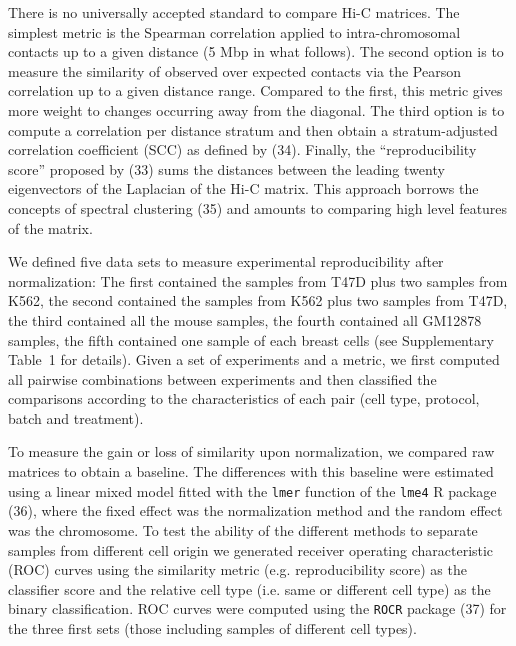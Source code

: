 \documentclass[a4,center,fleqn]{NAR}
\providecommand{\DIFadd}[1]{{\protect\color{red}#1}} %
\providecommand{\DIFdel}[1]{{\protect}}                      %
\providecommand{\DIFaddbegin}{} %
\providecommand{\DIFaddend}{} %
\providecommand{\DIFdelbegin}{} %
\providecommand{\DIFdelend}{} %
\begin{document}
There is no universally accepted standard to compare Hi-C matrices. The
simplest metric is the Spearman correlation applied to intra-chromosomal
contacts up to a given distance (5 \DIFdelbegin \DIFdel{Mb }\DIFdelend \DIFaddbegin \DIFadd{Mbp }\DIFaddend in what follows). The second option
is to measure the similarity of observed over expected contacts via the
Pearson correlation up to a given distance range. Compared to the first,
this metric gives more weight to changes occurring away from the diagonal.
The third option is to compute a correlation per distance stratum and then
obtain a stratum-adjusted correlation coefficient (SCC) as defined by
(34). Finally, the \DIFdelbegin \DIFdel{last option, }\DIFdelend \DIFaddbegin \DIFadd{``reproducibility score'' }\DIFaddend proposed by
(\DIFdelbegin \DIFdel{35) is to measure the Pearson correlation between the last }\DIFdelend \DIFaddbegin \DIFadd{33) sums the distances between the leading twenty
}\DIFaddend eigenvectors of the Laplacian of the Hi-C matrix. This approach borrows
the concepts of spectral clustering (\DIFdelbegin \DIFdel{36}\DIFdelend \DIFaddbegin \DIFadd{35}\DIFaddend ) and amounts to
comparing high level features of the matrix.

We defined \DIFdelbegin \DIFdel{three }\DIFdelend \DIFaddbegin \DIFadd{five }\DIFaddend data sets to measure experimental reproducibility after
normalization: The first contained the samples from T47D plus two samples
from K562, the second contained the samples from K562 plus two samples
from T47D, the third contained all the mouse samples\DIFdelbegin \DIFdel{(see Table
\ref{tab:samples} }\DIFdelend \DIFaddbegin \DIFadd{, the fourth contained all
GM12878 samples, the fifth contained one sample of each breast cells (see Supplementary
Table~1 }\DIFaddend for details). Given a set of experiments and a metric, we first
computed all pairwise combinations between experiments and then classified
the comparisons according to the characteristics of each pair (cell type,
protocol, batch and treatment).

To measure the gain or loss of similarity upon normalization, we compared
raw matrices to obtain a baseline. The differences with this baseline were
estimated using a linear mixed model fitted with the \texttt{lmer}
function of the \texttt{lme4} R package (\DIFdelbegin \DIFdel{37}\DIFdelend \DIFaddbegin \DIFadd{36}\DIFaddend ), where the
fixed effect was the normalization method and the random effect was the
chromosome. \DIFdelbegin \DIFdel{Receiver }\DIFdelend \DIFaddbegin \DIFadd{To test the ability of the different methods to separate samples
from different cell origin we generated receiver }\DIFaddend operating characteristic (ROC) curves
\DIFaddbegin \DIFadd{using the similarity metric (e.g. reproducibility score) as the classifier score
and the relative cell type (i.e. same or different cell type) as the binary
classification. ROC curves }\DIFaddend were computed using the \texttt{ROCR} package
(\DIFdelbegin \DIFdel{38) }\DIFdelend \DIFaddbegin \DIFadd{37) for the three first sets (those including samples of
different cell types)}\DIFaddend .
\end{document}
